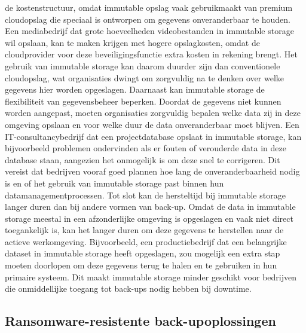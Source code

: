 de kostenstructuur, omdat immutable opslag vaak gebruikmaakt van premium cloudopslag die speciaal is ontworpen om gegevens onveranderbaar te houden. Een mediabedrijf dat grote hoeveelheden videobestanden in immutable storage wil opslaan, kan te maken krijgen met hogere opslagkosten, omdat de cloudprovider voor deze beveiligingsfunctie extra kosten in rekening brengt. Het gebruik van immutable storage kan daarom duurder zijn dan conventionele cloudopslag, wat organisaties dwingt om zorgvuldig na te denken over welke gegevens hier worden opgeslagen. Daarnaast kan immutable storage de flexibiliteit van gegevensbeheer beperken. Doordat de gegevens niet kunnen worden aangepast, moeten organisaties zorgvuldig bepalen welke data zij in deze omgeving opslaan en voor welke duur de data onveranderbaar moet blijven. Een IT-consultancybedrijf dat een projectdatabase opslaat in immutable storage, kan bijvoorbeeld problemen ondervinden als er fouten of verouderde data in deze database staan, aangezien het onmogelijk is om deze snel te corrigeren. Dit vereist dat bedrijven vooraf goed plannen hoe lang de onveranderbaarheid nodig is en of het gebruik van immutable storage past binnen hun datamanagementprocessen. Tot slot kan de hersteltijd bij immutable storage langer duren dan bij andere vormen van back-up. Omdat de data in immutable storage meestal in een afzonderlijke omgeving is opgeslagen en vaak niet direct toegankelijk is, kan het langer duren om deze gegevens te herstellen naar de actieve werkomgeving. Bijvoorbeeld, een productiebedrijf dat een belangrijke dataset in immutable storage heeft opgeslagen, zou mogelijk een extra stap moeten doorlopen om deze gegevens terug te halen en te gebruiken in hun primaire systeem. Dit maakt immutable storage minder geschikt voor bedrijven die onmiddellijke toegang tot back-ups nodig hebben bij downtime.
\subsection{Ransomware-resistente back-upoplossingen}
